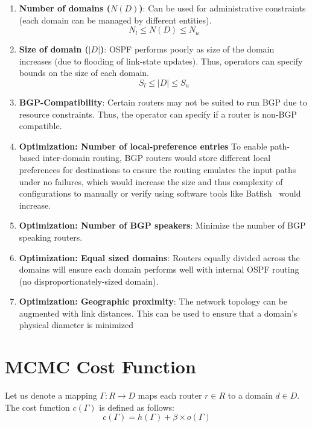 \begin{enumerate}
	\item \textbf{Number of domains ($N(D)$)}: 
	Can be used for administrative constraints 
	(each domain can be managed by different
	entities). 
	\begin{equation}
	N_l \leq N(D) \leq N_u
	\end{equation}

	\item \textbf{Size of domain ($|D|$)}: OSPF
	performs poorly as size of the domain increases
	(due to flooding of link-state updates). Thus,
	operators can specify bounds on the size of each
	domain.
	\begin{equation}
	S_l \leq |D| \leq S_u
	\end{equation}

	\item \textbf{BGP-Compatibility}: Certain 
	routers may not be suited to run BGP due to resource
	constraints. Thus, the operator can specify if a 
	router is non-BGP compatible. 

	\item \textbf{Optimization: Number of local-preference entries} 
	To enable path-based inter-domain routing, BGP routers
	would store different local preferences for destinations
	to ensure the routing emulates the input paths under no 
	failures, which would increase the size and thus complexity
	of configurations to manually or verify using software tools
	like Batfish~\cite{batfish} would increase. 

	\item \textbf{Optimization: Number of BGP speakers}: 
	Minimize the number of BGP speaking routers.

	\item \textbf{Optimization: Equal sized domains}:
	Routers equally divided across the domains will ensure 
	each domain performs well with internal OSPF routing (no 
	disproportionately-sized domain). 

	\item \textbf{Optimization: Geographic proximity}:
	The network topology can be augmented with link distances. 
	This can be used to ensure that a domain's physical diameter
	is minimized 
\end{enumerate}

\section{MCMC Cost Function}
Let us denote a mapping $\Gamma: R \rightarrow D$ maps each 
router $r \in R$ to a domain $d \in D$. The cost function 
$c(\Gamma)$ is defined as follows: 
\begin{equation}
	c(\Gamma) = h(\Gamma) + \beta \times o(\Gamma)
\end{equation}